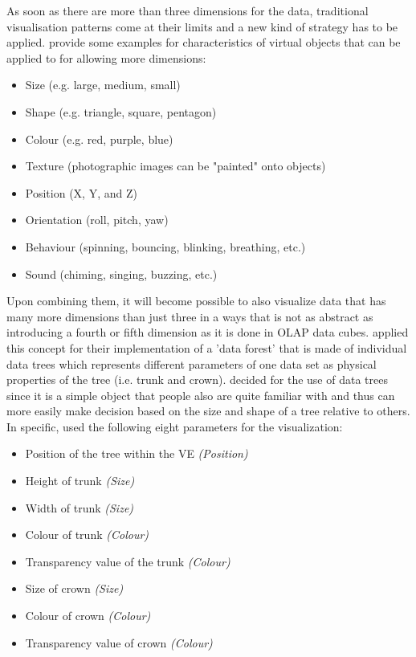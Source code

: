 As soon as there are more than three dimensions for the data, traditional visualisation patterns come at their limits and a new kind of strategy has to be applied. \cite{Stone1994} provide some examples for characteristics of virtual objects that can be applied to for allowing more dimensions:
\begin{itemize}[noitemsep,nolistsep]
	\item Size (e.g. large, medium, small)
	\item Shape (e.g. triangle, square, pentagon)
	\item Colour (e.g. red, purple, blue)
	\item Texture (photographic images can be "painted" onto objects)
	\item Position (X, Y, and Z)
	\item Orientation (roll, pitch, yaw)
	\item Behaviour (spinning, bouncing, blinking, breathing, etc.)
	\item Sound (chiming, singing, buzzing, etc.)
\end{itemize}
Upon combining them, it will become possible to also visualize data that has many more dimensions than just three in a ways that is not as abstract as introducing a fourth or fifth dimension as it is done in OLAP data cubes. \cite{Jamieson2007} applied this concept for their implementation of a 'data forest' that is made of individual data trees which represents different parameters of one data set as physical properties of the tree (i.e. trunk and crown). \cite{Jamieson2007} decided for the use of data trees since it is a simple object that people also are quite familiar with and thus can more easily make decision based on the size and shape of a tree relative to others. In specific, \cite{Jamieson2007} used the following eight parameters for the visualization:
\begin{itemize}[noitemsep,nolistsep]
	\item Position of the tree within the VE \textit{(Position)}
	\item Height of trunk \textit{(Size)}
	\item Width of trunk \textit{(Size)}
	\item Colour of trunk \textit{(Colour)}
	\item Transparency value of the trunk \textit{(Colour)}
	\item Size of crown \textit{(Size)}
	\item Colour of crown  \textit{(Colour)}
	\item Transparency value of crown  \textit{(Colour)}
\end{itemize}

